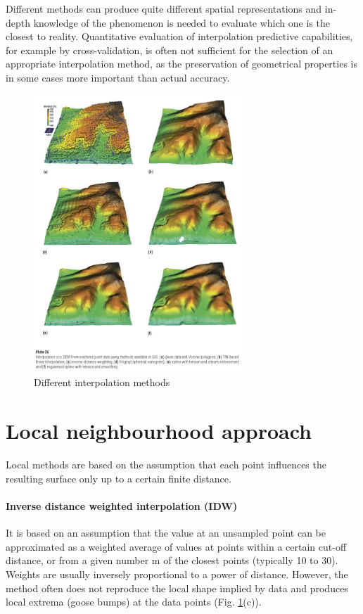 \documentclass{article}
\begin{document}
Different methods can produce quite different spatial representations and in-depth knowledge of the phenomenon is needed to evaluate which one is the closest to reality. Quantitative evaluation of interpolation predictive capabilities, for example by cross-validation, is often not sufficient for the selection of an appropriate interpolation method, as the preservation of geometrical properties is in some cases more important than actual accuracy.

\begin{figure}[h!]
    \centering
    \includegraphics[width=0.7\textwidth]{img/interpolation.jpg}
    \caption{Different interpolation methods}
    \label{fig:my_label}
\end{figure}

\section{Local neighbourhood approach}
Local methods are based on the assumption that each point influences the resulting surface only up to a certain finite distance.
\paragraph{Inverse distance weighted interpolation (IDW)}
It is based on an assumption that the value at an unsampled point can be approximated as a weighted average of values at points within a certain cut-off distance, or from a given number m of the closest points (typically 10 to 30). Weights are usually inversely proportional to a power of distance. However, the method often does not reproduce the local shape implied by data and produces local extrema (goose bumps) at the data points (Fig. \ref{fig:my_label}(c)).
\end{document}
